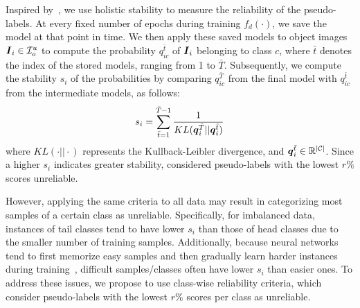 Inspired by~\cite{yang2022st++}, we use holistic stability to measure the reliability of the pseudo-labels. At every fixed number of epochs during training $f_d(\cdot)$, we save the model at that point in time. We then apply these saved models to object images $\boldsymbol{I}_i \in \mathcal{I}^u_o$ to compute the probability $q^{\bar{t}}_{ic}$ of $\boldsymbol{I}_i$ belonging to class $c$, where $\bar{t}$ denotes the index of the stored models, ranging from 1 to $\bar{T}$. Subsequently, we compute the stability $s_{i}$ of the probabilities by comparing $q^{\bar{T}}_{ic}$ from the final model with $q^{\bar{t}}_{ic}$ from the intermediate models, as follows:
\begin{equation}
s_{i} = \sum_{\bar{t}=1}^{\bar{T} - 1} \frac{1}{KL(\boldsymbol{q}^{\bar{T}}_{i} || \boldsymbol{q}^{\bar{t}}_{i})}
\label{eqn:stability}
\end{equation}
where $KL(\cdot||\cdot)$ represents the Kullback-Leibler divergence, and $\boldsymbol{q}^{\bar{t}}_{i} \in \mathbb{R}^{|\mathcal{C}|}$. Since a higher $s_{i}$ indicates greater stability, \cite{yang2022st++} considered pseudo-labels with the lowest $r\%$ scores unreliable.




However, applying the same criteria to all data may result in categorizing most samples of a certain class as unreliable. Specifically, for imbalanced data, instances of tail classes tend to have lower $s_{i}$ than those of head classes due to the smaller number of training samples. Additionally, because neural networks tend to first memorize easy samples and then gradually learn harder instances during training~\cite{arpit2017closer}, difficult samples/classes often have lower $s_{i}$ than easier ones. To address these issues, we propose to use class-wise reliability criteria, which consider pseudo-labels with the lowest $r\%$ scores per class as unreliable. 




